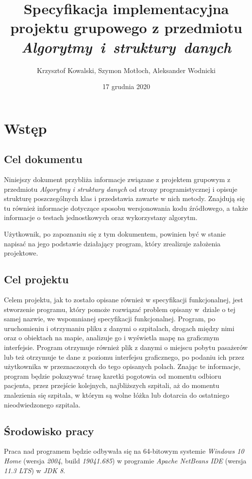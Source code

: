 \documentclass[12pt,a4paper]{article}
\title{Specyfikacja implementacyjna projektu grupowego z przedmiotu \textit{Algorytmy~i~struktury~danych}}
\author{Krzysztof Kowalski, Szymon Motłoch, Aleksander Wodnicki}
\date{17 grudnia 2020}
\begin{document}
\maketitle
\thispagestyle{empty}
\newpage
\pagestyle{fancy}
\fancyhf{}
\tableofcontents
\newpage

\section{Wstęp}
\subsection{Cel dokumentu} %
Niniejszy dokument przybliża informacje związane z projektem grupowym z przedmiotu \textit{Algorytmy i struktury danych} od strony programistycznej i opisuje strukturę poszczególnych klas i przedstawia zawarte w nich metody. Znajdują się tu również informacje dotyczące sposobu wersjonowania kodu źródłowego, a także informacje o testach jednostkowych oraz wykorzystany algorytm.

Użytkownik, po zapoznaniu się z tym dokumentem, powinien być w stanie napisać na jego podstawie działający program, który zrealizuje założenia projektowe.

\subsection{Cel projektu} %
Celem projektu, jak to zostało opisane również w specyfikacji funkcjonalnej, jest stworzenie programu, który pomoże rozwiązać problem opisany w~dziale o tej samej nazwie, we wspomnianej specyfikacji funkcjonalnej. Program, po uruchomieniu i otrzymaniu pliku z danymi o szpitalach, drogach między nimi oraz o obiektach na mapie, analizuje go i wyświetla mapę na graficznym interfejsie. Program otrzymuje również plik z danymi o miejscu pobytu pasażerów lub też otrzymuje te dane z poziomu interfejsu graficznego, po podaniu ich przez użytkownika w przeznaczonych do tego opisanych polach. Znając te informacje, program będzie pokazywać trasę karetki pogotowia od momentu odbioru pacjenta, przez przejście kolejnych, najbliższych szpitali, aż do momentu znalezienia się szpitala, w którym są wolne łóżka lub dotarcia do ostatniego nieodwiedzonego szpitala. 

\subsection{Środowisko pracy} %
Praca nad programem będzie odbywała się na 64-bitowym systemie \textit{Windows 10 Home} (wersja \textit{2004}, build \textit{19041.685}) w programie \textit{Apache NetBeans IDE} (wersja \textit{11.3 LTS}) w \textit{JDK 8}.
\newpage
\end{document}

